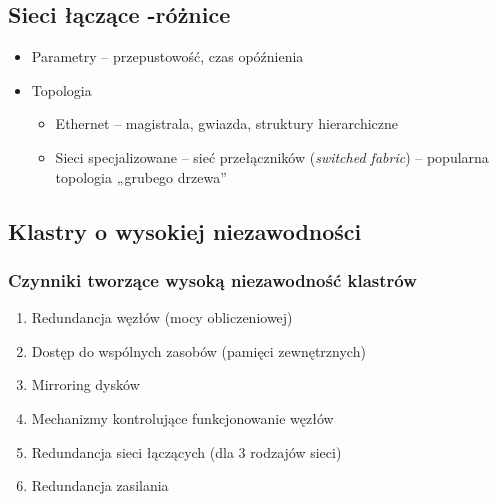 	\subsection{Sieci łączące -różnice}
		\begin{itemize}
			\item Parametry – przepustowość, czas opóźnienia
			\item Topologia
			\begin{itemize}
				\item Ethernet – magistrala, gwiazda, struktury hierarchiczne
				\item Sieci specjalizowane – sieć przełączników (\textit{switched fabric}) – popularna topologia „grubego drzewa”
			\end{itemize}
		\end{itemize}
	\subsection{Klastry o wysokiej niezawodności} \label{subsec:niezawodnoscKlastrow}
		\subsubsection{Czynniki tworzące wysoką niezawodność klastrów}
			\begin{enumerate}
				\item Redundancja węzłów (mocy obliczeniowej)
				\item Dostęp do wspólnych zasobów (pamięci zewnętrznych)
				\item Mirroring dysków
				\item Mechanizmy kontrolujące funkcjonowanie węzłów
				\item Redundancja sieci łączących (dla 3 rodzajów sieci)
				\item Redundancja zasilania
			\end{enumerate}
